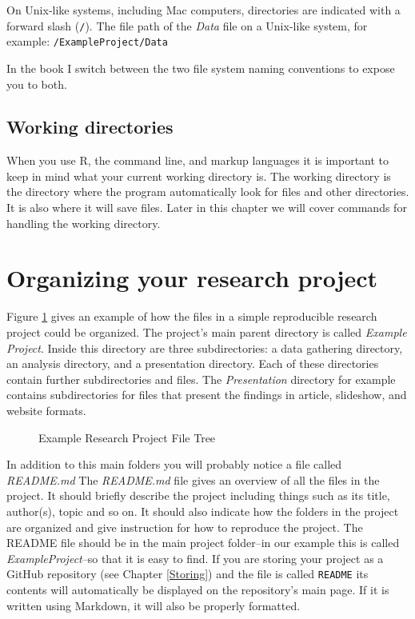 {On Unix-like systems, including Mac computers, directories are indicated with a forward slash (\texttt{/}). The file path of the {\emph{Data}} file on a Unix-like system, for example: \texttt{/ExampleProject/Data}

In the book I switch between the two file system naming conventions to expose you to both.

\subsection{Working directories}

When you use R, the command line, and markup languages it is important to keep in mind what your current working directory is. The working directory is the directory where the program automatically look for files and other directories. It is also where it will save files. Later in this chapter we will cover commands for handling the working directory.

\section{Organizing your research project}

Figure \ref{ExampleTree} gives an example of how the files in a simple reproducible research project could be organized. The project's main parent directory is called {\emph{Example Project}}. Inside this directory are three subdirectories: a data gathering directory, an analysis directory, and a presentation directory. Each of these directories contain further subdirectories and files. The {\emph{Presentation}} directory for example contains subdirectories for files that present the findings in article, slideshow, and website formats.

\clearpage
\thispagestyle{plain}
\begin{landscape}
\begin{figure}[th!]
    \caption{Example Research Project File Tree}
    \label{ExampleTree}
    \begin{center}
    
    
    \end{center}
\end{figure}
\end{landscape}

In addition to this main folders you will probably notice a file called {\emph{README.md}} The {\emph{README.md}} file gives an overview of all the files in the project. It should briefly describe the project including things such as its title, author(s), topic and so on. It should also indicate how the folders in the project are organized and give instruction for how to reproduce the project. The README file should be in the main project folder--in our example this is called {\emph{ExampleProject}}--so that it is easy to find. If you are storing your project as a GitHub repository (see Chapter \ref{Storing}) and the file is called \texttt{README} its contents will automatically be displayed on the repository's main page. If it is written using Markdown, it will also be properly formatted.

}
